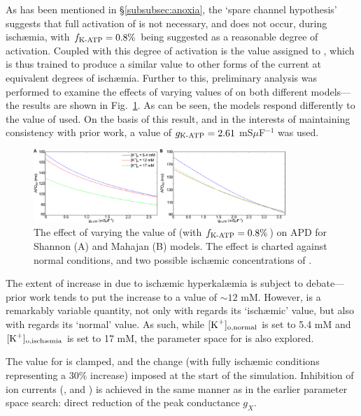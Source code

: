\documentclass[../thesis-main.tex]{subfiles}
\begin{document}
As has been mentioned in \S\ref{subsubsec:anoxia}, the `spare channel hypothesis' suggests that full activation of \ikatp{} is not necessary, and does not occur, during isch\ae{}mia, with $f_\textnormal{K-ATP}=0.8\%$ being suggested as a reasonable degree of activation. Coupled with this degree of activation is the value assigned to \gkatp{}, which is thus trained to produce a similar value to other forms of the current at equivalent degrees of isch\ae{}mia. Further to this, preliminary analysis was performed to examine the effects of varying values of \gkatp{} on both different models---the results are shown in Fig.~\ref{fig:gkatp-effect}. As can be seen, the models respond differently to the value of \gkatp{} used. On the basis of this result, and in the interests of maintaining consistency with prior work, a value of $g_\textnormal{K-ATP}=2.61$ mS$\mu$F$^{-1}$ was used.%
\begin{figure}
 \centering
 \includegraphics[width=0.85\textwidth]{gkatp-effect}
 \caption[Effect of varying \gkatp{} on APD]{The effect of varying the value of \gkatp{} (with $f_\textnormal{K-ATP}=0.8\%$) on APD for Shannon (A) and Mahajan (B) models. The effect is charted against normal conditions, and two possible isch\ae{}mic concentrations of \ko{}.}
 \label{fig:gkatp-effect}
\end{figure}

The extent of increase in \ko{} due to isch\ae{}mic hyperkal\ae{}mia is subject to debate---prior work tends to put the increase to a value of $\sim12$ mM. However, \ko{} is a remarkably variable quantity, not only with regards its `isch\ae{}mic' value, but also with regards its `normal' value. As such, while $[\textnormal{K}^+]_\textnormal{o,normal}$ is set to 5.4 mM and $[\textnormal{K}^+]_\textnormal{o,isch\ae{}mia}$ is set to 17 mM, the parameter space for \ko{} is also explored.

The value for \nai{} is clamped, and the change (with fully isch\ae{}mic conditions representing a $30\%$ increase) imposed at the start of the simulation. Inhibition of ion currents (\ina{}, \ica{} and \inak{}) is achieved in the same manner as in the earlier parameter space search: direct reduction of the peak conductance $g_X$.
\end{document}
